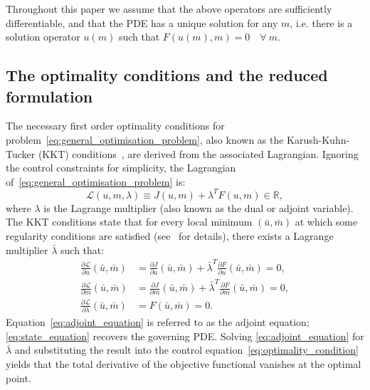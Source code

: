 \documentclass[prodmode,acmtoms]{acmsmall}
\begin{document}
Throughout this paper we assume that the above operators are sufficiently differentiable, and that the PDE has a unique solution for any $m$, i.e.
there is a solution operator $u(m)$ such that $F(u(m), m) = 0 \quad \forall \ m$.

\subsection{The optimality conditions and the reduced formulation}\label{sec:the_optimality_system}
The necessary first order optimality conditions for problem~\eqref{eq:general_optimisation_problem}, also known as the Karush-Kuhn-Tucker (KKT) conditions~\cite{karush1939,kuhn1951},
are derived from the associated Lagrangian.
Ignoring the control constraints for simplicity, the Lagrangian of~\eqref{eq:general_optimisation_problem} is:
\begin{equation*}
 \mathcal L(u, m, \lambda) \equiv J(u, m) + \lambda^T F(u, m) \in \mathbb R,
\end{equation*}
where $\lambda$ is the Lagrange multiplier (also known as the dual or adjoint variable).
The KKT conditions state that for every local minimum $(\bar u, \bar m)$ at which some regularity conditions are satisfied (see~ for details), there exists a Lagrange multiplier $\bar \lambda$ such that:
\begin{subequations}
 \begin{align}
  \frac{\partial \mathcal L}{\partial u}(\bar u, \bar m)& = \frac{\partial  J}{\partial u}(\bar u, \bar m)  + \bar \lambda^T \frac{\partial  F}{\partial u}(\bar u, \bar m) = 0, \label{eq:optimality_condition} \\  
  \frac{\partial \mathcal L}{\partial m}(\bar u, \bar m) & = \frac{\partial  J}{\partial m}(\bar u, \bar m)  + \bar \lambda^T \frac{\partial  F}{\partial m}(\bar u, \bar m) = 0, \label{eq:adjoint_equation} \\  
  \frac{\partial \mathcal L}{\partial \lambda}(\bar u, \bar m) & = F(\bar u, \bar m) = 0. \label{eq:state_equation} 
 \end{align}\label{eq:kkt_system}\end{subequations}
Equation~\eqref{eq:adjoint_equation} is referred to as the adjoint equation; \eqref{eq:state_equation} recovers the governing PDE.
Solving \eqref{eq:adjoint_equation} for $\bar \lambda$ and substituting the result into the control equation~\eqref{eq:optimality_condition} yields that the total derivative of the objective functional vanishes at the optimal point.
\end{document}
